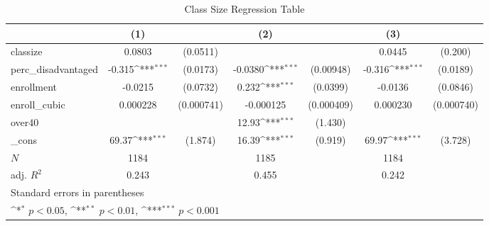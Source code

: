\begin{table}[htbp]\centering
\def\sym#1{\ifmmode^{#1}\else\(^{#1}\)\fi}
\caption{Class Size Regression Table\label{tab3}}
\begin{tabular}{l*{3}{cc}}
\toprule
            &\multicolumn{1}{c}{(1)}         &            &\multicolumn{1}{c}{(2)}         &            &\multicolumn{1}{c}{(3)}         &            \\
\midrule
classize    &      0.0803         &    (0.0511)&                     &            &      0.0445         &     (0.200)\\
perc\_disadvantaged&      -0.315\sym{***}&    (0.0173)&     -0.0380\sym{***}&   (0.00948)&      -0.316\sym{***}&    (0.0189)\\
enrollment  &     -0.0215         &    (0.0732)&       0.232\sym{***}&    (0.0399)&     -0.0136         &    (0.0846)\\
enroll\_cubic&    0.000228         &  (0.000741)&   -0.000125         &  (0.000409)&    0.000230         &  (0.000740)\\
over40      &                     &            &       12.93\sym{***}&     (1.430)&                     &            \\
\_cons      &       69.37\sym{***}&     (1.874)&       16.39\sym{***}&     (0.919)&       69.97\sym{***}&     (3.728)\\
\midrule
\(N\)       &        1184         &            &        1185         &            &        1184         &            \\
adj. \(R^{2}\)&       0.243         &            &       0.455         &            &       0.242         &            \\
\bottomrule
\multicolumn{7}{l}{\footnotesize Standard errors in parentheses}\\
\multicolumn{7}{l}{\footnotesize \sym{*} \(p<0.05\), \sym{**} \(p<0.01\), \sym{***} \(p<0.001\)}\\
\end{tabular}
\end{table}

